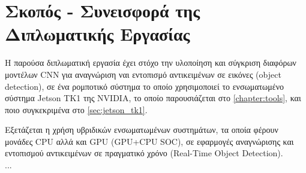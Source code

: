\section{Σκοπός - Συνεισφορά της Διπλωματικής Εργασίας}
\label{section:contribution}
Η παρούσα διπλωματική εργασία  έχει στόχο την υλοποίηση και σύγκριση διαφόρων
μοντέλων CNN για αναγνώριση ναι εντοπισμό αντικειμένων σε εικόνες
(object detection), σε ένα ρομποτικό σύστημα το οποίο χρησιμοποιεί το
ενσωματωμένο σύστημα Jetson TK1 της NVIDIA, το οποίο παρουσιάζεται
στο \autoref{chapter:tools}, και ποιο συγκεκριμένα στο \autoref{sec:jetson_tk1}.

Eξετάζεται η χρήση υβριδικών ενσωματωμένων συστημάτων, τα οποία
φέρουν μονάδες CPU αλλά και GPU (GPU+CPU SOC), σε εφαρμογές αναγνώρισης
και εντοπισμού αντικειμένων σε πραγματικό χρόνο (Real-Time Object Detection).
\\

...
